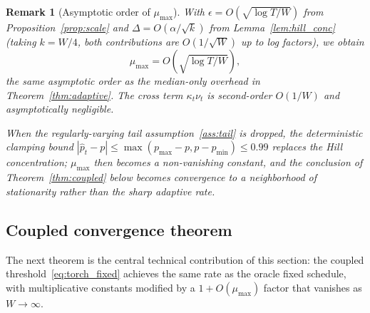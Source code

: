 \documentclass[11pt]{article}
\newtheorem{remark}[theorem]{Remark}
\theoremstyle{definition}
\newcommand{\abs}[1]{\left| #1 \right|}
\newcommand{\phat}{\hat{p}}
\begin{document}
\begin{remark}[Asymptotic order of $\mu_{\max}$]\label{rem:mu_size}
With $\epsilon = O(\sqrt{\log T/W})$ from Proposition~\ref{prop:scale} and
$\Delta = O(\alpha/\sqrt{k})$ from Lemma~\ref{lem:hill_conc} (taking
$k = W/4$, both contributions are $O(1/\sqrt{W})$ up to log factors), we obtain
\[
  \mu_{\max} = O\!\left(\sqrt{\log T / W}\right),
\]
the same asymptotic order as the median-only overhead in
Theorem~\ref{thm:adaptive}. The cross term $\kappa_t\nu_t$ is second-order
$O(1/W)$ and asymptotically negligible.

When the regularly-varying tail assumption~\ref{ass:tail} is dropped, the
deterministic clamping bound $\abs{\phat_t - p} \leq \max(p_{\max}-p, p-p_{\min})
\leq 0.99$ replaces the Hill concentration; $\mu_{\max}$ then becomes a
non-vanishing constant, and the conclusion of
Theorem~\ref{thm:coupled} below becomes convergence to a neighborhood of
stationarity rather than the sharp adaptive rate.
\end{remark}

\subsection{Coupled convergence theorem}
\label{ssec:coupled_main}

The next theorem is the central technical contribution of this section:
the coupled threshold~\eqref{eq:torch_fixed} achieves the same rate as the
oracle fixed schedule, with multiplicative constants modified by a
$1 + O(\mu_{\max})$ factor that vanishes as $W \to \infty$.
\end{document}
